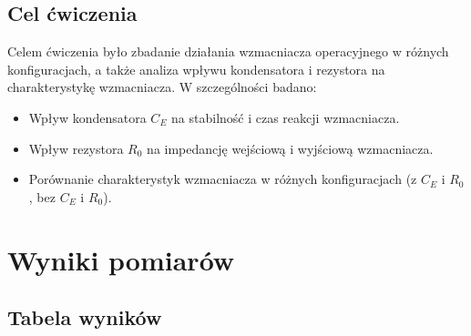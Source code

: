 \documentclass[11pt]{article}
\begin{document}
\subsection*{Cel ćwiczenia}

Celem ćwiczenia było zbadanie działania wzmacniacza operacyjnego w różnych konfiguracjach, 
a także analiza wpływu kondensatora i rezystora na charakterystykę wzmacniacza. W szczególności badano:
\begin{itemize}
    \item Wpływ kondensatora $C_E$ na stabilność i czas reakcji wzmacniacza.
    \item Wpływ rezystora $R_0$ na impedancję wejściową i wyjściową wzmacniacza.
    \item Porównanie charakterystyk wzmacniacza w różnych konfiguracjach (z $C_E$ i $R_0$, bez $C_E$ i $R_0$).
\end{itemize}

\clearpage
\section*{Wyniki pomiarów}
\subsection*{Tabela wyników}
\end{document}
